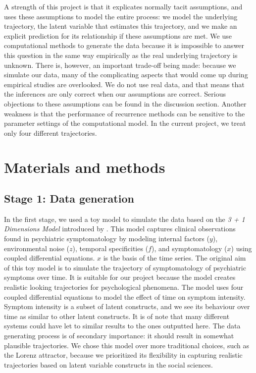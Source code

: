 \documentclass[utf8]{FrontiersinVancouver}
\begin{document}
A strength of this project is that it explicates normally tacit assumptions, and uses these assumptions to model the entire process: we model the underlying trajectory, the latent variable that estimates this trajectory, and we make an explicit prediction for its relationship if these assumptions are met. We use computational methods to generate the data because it is impossible to answer this question in the same way empirically as the real underlying trajectory is unknown. There is, however, an important trade-off being made: because we simulate our data, many of the complicating aspects that would come up during empirical studies are overlooked. We do not use real data, and that means that the inferences are only correct when our assumptions are correct. Serious objections to these assumptions can be found in the discussion section. Another weakness is that the performance of recurrence methods can be sensitive to the parameter settings of the computational model. In the current project, we treat only four different trajectories.

\section{Materials and methods}
\subsection{Stage 1: Data generation}
In the first stage, we used a toy model to simulate the data based on the \textit{3 + 1 Dimensions Model} introduced by \citep{gauldDynamicalSystemsComputational2023}. This model captures clinical observations found in psychiatric symptomatology by modeling internal factors ($y$), environmental noise ($z$), temporal specificities ($f$), and symptomatology ($x$) using coupled differential equations. $x$ is the basis of the time series. The original aim of this toy model is to simulate the trajectory of symptomatology of psychiatric symptoms over time. It is suitable for our project because the model creates realistic looking trajectories for psychological phenomena. The model uses four coupled differential equations to model the effect of time on symptom intensity. Symptom intensity is a subset of latent constructs, and we see its behaviour over time as similar to other latent constructs. It is of note that many different systems could have let to similar results to the ones outputted here. The data generating process is of secondary importance: it should result in somewhat plausible trajectories. We chose this model over more traditional choices, such as the Lorenz attractor, because we prioritized its flexibility in capturing realistic trajectories based on latent variable constructs in the social sciences.
\end{document}
